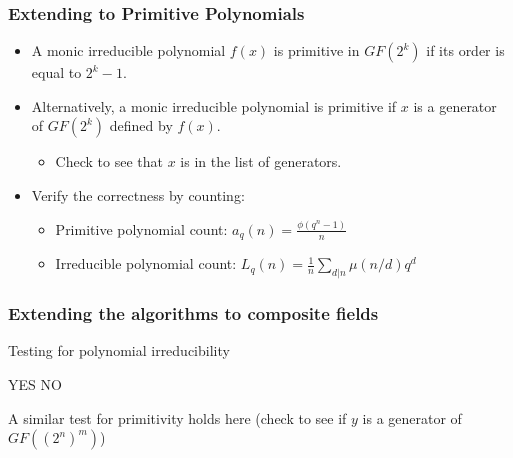 \documentclass[handout]{beamer}
\begin{document}
\begin{frame}[fragile]
	\frametitle{Extending to Primitive Polynomials}
	\begin{itemize}
		\item A monic irreducible polynomial $f(x)$ is primitive in $GF(2^k)$ if its order is equal to $2^k - 1$.
		\item Alternatively, a monic irreducible polynomial is primitive if $x$ is a generator of $GF(2^k)$ defined by $f(x)$.
		\begin{itemize}
			\item Check to see that $x$ is in the list of generators.
		\end{itemize}
		\item Verify the correctness by counting:
		\begin{itemize}
			\item Primitive polynomial count: $a_q(n) = \frac{\phi(q^n - 1)}{n}$ 
			\item Irreducible polynomial count: $L_q(n) = \frac{1}{n}\sum_{d | n}\mu(n/d)q^d$
		\end{itemize}
	\end{itemize}
\end{frame}

\begin{frame}[fragile]
	\frametitle{Extending the algorithms to composite fields}
\begin{algorithm}[H] 
\caption{Testing for polynomial irreducibility} 
\begin{algorithmic}[1]
\Require{}
		\Return YES
	\EndIf
\EndFor
\Return NO
\end{algorithmic}
\end{algorithm}

\begin{center}
A similar test for primitivity holds here (check to see if $y$ is a generator of $GF((2^n)^m)$)
\end{center}
\end{frame}
\end{document}
